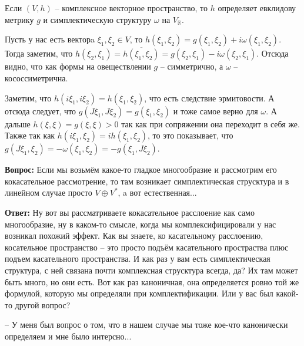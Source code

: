 Если $(V,h)$ – комплексное векторное пространство, то $h$ определяет евклидову
метрику $g$ и симплектическую структуру $\omega$ на $V_{\mathbb R}$.

Пусть у нас есть векторa $\xi_1,\xi_2\in V$, то $h(\xi_1,\xi_2)=g(\xi_1,\xi_2)
+i\omega(\xi_1,\xi_2)$. Тогда заметим, что $h(\xi_2,\xi_1)=
\overline{h(\xi_1,\xi_2)}=g(\xi_2,\xi_1)-i\omega(\xi_2,\xi_1)$. Отсюда видно,
что как формы на овеществлении $g$ – симметрично, а $\omega$ – кососсиметрична.

Заметим, что $h(i\xi_1,i\xi_2)=h(\xi_1,\xi_2)$, что есть следствие эрмитовости.
А отсюда следует, что $g(J\xi_1,J\xi_2)=g(\xi_1,\xi_2)$ и тоже самое верно для
$\omega$. А дальше $h(\xi,\xi)=g(\xi,\xi)>0$ так как при сопряжении она переходит
в себя же. Также так как $h(i\xi_1,\xi_2)=ih(\xi_1,\xi_2)$, то это показывает,
что $g(J\xi_1,\xi_2)=-\omega(\xi_1,\xi_2)=-g(\xi_1,J\xi_2)$.

\textbf{Вопрос:} Если мы возьмём какое-то гладкое многообразие и рассмотрим его
кокасательное рассмотрение, то там возникает симплектическая струсктура и в
линейном случае просто $V\oplus V^*$, a вот естественная...

\textbf{Ответ:} Ну вот вы рассматриваете кокасательное расслоение как само
многообразие, ну в каком-то смысле, когда мы комплексифицировали у нас возникал
похожий эффект. Как вы знаете, ко касательному расслоению, косательное пространство
– это просто подъём касательного простраства плюс подъем касательного пространства.
И как раз у вам есть симплектическая структура, с ней связана почти комплексная
струсктура всегда, да? Их там может быть много, но они есть. Вот как раз каноничная,
она определяется ровно той же формулой, которую мы определяли при комплектификации.
Или у вас был какой-то другой вопрос?

– У меня был вопрос о том, что в нашем случае мы тоже кое-что канонически определяем
и мне было интерсно...

